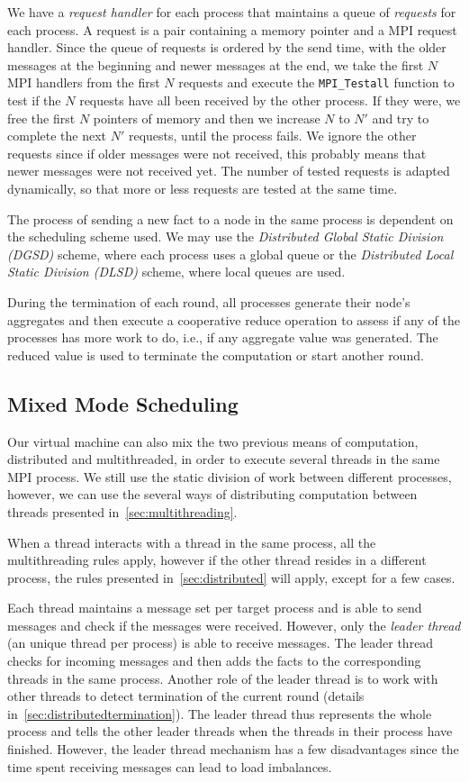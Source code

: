 \documentclass[preprint]{sigplanconf}
\begin{document}
We have a \emph{request handler} for each process that
maintains a queue of \emph{requests} for each process. A request is a pair containing a memory pointer
and a MPI request handler. Since the queue of requests is ordered by the send time, with the
older messages at the beginning and newer messages at the end, we take the first $N$ MPI handlers
from the first $N$ requests and execute the \texttt{MPI\_Testall} function to test if the
$N$ requests have all been received by the other process. If they were, we free the first $N$ pointers
of memory and then we increase $N$ to $N'$ and try to complete the next $N'$ requests, until
the process fails. We ignore the other requests since if older messages were not received, this
probably means that newer messages were not received yet. The number of tested requests is adapted
dynamically, so that more or less requests are tested at the same time.

The process of sending a new fact to a node in the same process is dependent on the scheduling
scheme used. We may use the \emph{Distributed Global Static Division (DGSD)} scheme,
where each process uses a global queue or the \emph{Distributed Local Static Division (DLSD)} scheme,
where local queues are used.

During the termination of each round, all processes generate their node's aggregates and then
execute a cooperative reduce operation to assess if any of the processes has more work to do,
i.e., if any aggregate value was generated. The reduced value is used
to terminate the computation or start another round.

\subsection{Mixed Mode Scheduling}

Our virtual machine can also mix the two previous means of computation, distributed and multithreaded,
in order to execute several threads in the same MPI process. We still use the static division of
work between different processes, however, we can use the several ways of distributing computation
between threads presented in~\ref{sec:multithreading}.

When a thread interacts with a thread in the same process, all the multithreading rules apply,
however if the other thread resides in a different process, the rules presented 
in~\ref{sec:distributed} will apply, except for a few cases.

Each thread maintains
a message set per target process and is able to send messages and check if the messages were received.
However, only the \emph{leader thread} (an unique thread per process) is able to receive
messages. The leader thread checks for incoming messages and then adds the facts to the
corresponding threads in the same process.
Another role of the leader thread is to work with other threads to detect termination of the
current round (details in~\ref{sec:distributedtermination}). The leader thread thus represents
the whole process and tells the other leader threads when the threads in their process have finished.
However, the leader thread mechanism has a few disadvantages since the time spent receiving messages
can lead to load imbalances.
\end{document}

